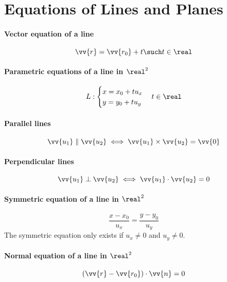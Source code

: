 \section{Equations of Lines and Planes}
\paragraph{Vector equation of a line}
	\begin{equation}
		\vv{r}= \vv{r_0} + t \such t \in \real
	\end{equation}
\paragraph{Parametric equations of a line in $\real^2$}
	\begin{equation}
		L:
		\begin{cases}
			x = x_0 + tu_x\\
			y = y_0 + tu_y
		\end{cases}
		t \in \real
	\end{equation}
\paragraph{Parallel lines}
	\begin{equation}
		\vv{u_1} \parallel \vv{u_2} \iff \vv{u_1} \times \vv{u_2} = \vv{0}
	\end{equation}
\paragraph{Perpendicular lines}
	\begin{equation}
		\vv{u_1} \perp \vv{u_2} \iff \vv{u_1} \cdot \vv{u_2} = 0
	\end{equation}
\paragraph{Symmetric equation of a line in $\real^2$}
	\begin{equation}
		\frac{x-x_0}{u_x} = \frac{y-y_0}{u_y}
	\end{equation}
	The symmetric equation only exists if $u_x \neq 0$ and $u_y \neq 0$.
\paragraph{Normal equation of a line in $\real^2$}
	\begin{equation}
		\left( \vv{r} - \vv{r_0} \right) \cdot \vv{n} = 0
	\end{equation}
